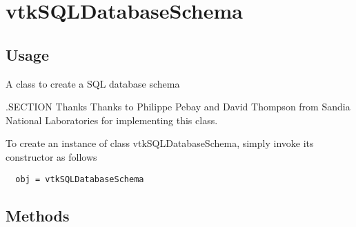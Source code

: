 \section{vtkSQLDatabaseSchema}

\subsection{Usage}

  A class to create a SQL database schema

 .SECTION Thanks
 Thanks to Philippe Pebay and David Thompson from Sandia National 
 Laboratories for implementing this class.


To create an instance of class vtkSQLDatabaseSchema, simply
invoke its constructor as follows
\begin{verbatim}
  obj = vtkSQLDatabaseSchema
\end{verbatim}
\subsection{Methods}

